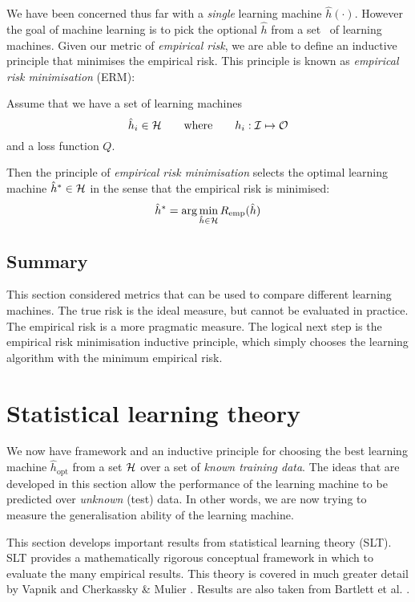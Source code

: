 We have been concerned thus far with a \emph{single} learning
machine $\hat{h}(\cdot)$.  However the goal of machine learning is to
pick the optional $\hat{h}$  from a set \calH\ of learning machines.
Given our metric of \emph{empirical risk}, we are able to define an
inductive principle that minimises the empirical risk.  This principle
is known as \emph{empirical risk minimisation} (ERM):

Assume that we have a set of learning machines
%
\begin{equation}
\hat{h}_i \in \mathcal{H} \qquad \mbox{where} \qquad h_i : \mathcal{I} \mapsto
\mathcal{O}
\end{equation}
%
and a loss function $Q$.

Then the principle of \emph{empirical risk minimisation} selects the
optimal learning machine $\hat{h}^{\ast} \in \mathcal{H}$ in the sense that
the empirical risk is minimised:
%
\begin{equation}
\hat{h}^{\ast} = \arg \min_{\hat{h} \in \mathcal{H}} R_{\mathrm{emp}}(\hat{h})
\label{eqn:erm}
\end{equation}

\subsection{Summary}

This section considered metrics that can be used to compare different
learning machines.  The true risk is the ideal measure, but cannot be
evaluated in practice.  The empirical risk is a more pragmatic
measure.  The logical next step is the empirical risk minimisation
inductive principle, which simply chooses the learning algorithm with
the minimum empirical risk.





\section{Statistical learning theory}
\label{sec:slt}

We now have framework and an inductive principle for choosing the
best learning machine $\hat{h}_{\mbox{opt}}$ from a set $\mathcal{H}$ over a
set of \emph{known training data}.  The ideas that are developed in
this section allow the performance of the learning machine to be
predicted over \emph{unknown} (test) data.  In other words, we are now
trying to measure the generalisation ability of the learning machine.

This section develops important results from statistical learning
theory (SLT).  SLT provides a mathematically rigorous
conceptual framework in which to evaluate the many empirical results.
This theory is covered in much greater detail by Vapnik
\cite{Vapnik98} and Cherkassky \& Mulier \cite{Cherkassky98}.  Results
are also taken from Bartlett et al. \cite{Bartlett98a}.

